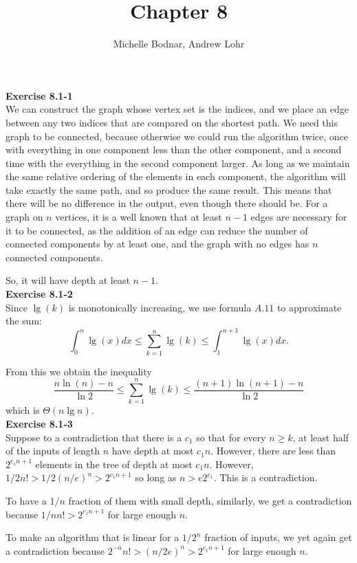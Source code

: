 \documentclass{article}
\title{Chapter 8}
\author{Michelle Bodnar, Andrew Lohr}
\begin{document}
\maketitle

\noindent\textbf{Exercise 8.1-1}\\

We can construct the graph whose vertex set is the indices, and we place an edge between any two indices that are compared on the shortest path. We need this graph to be connected, because otherwise we could run the algorithm twice, once with everything in one component less than the other component, and a second time with the everything in the second component larger. As long as we maintain the same relative ordering of the elements in each component, the algorithm will take exactly the same path, and so produce the same result. This means that there will be no difference in the output, even though there should be. For a graph on $n$ vertices, it is a well known that at least $n-1$ edges are necessary for it to be connected, as the addition of an edge can reduce the number of connected components by at least one, and the graph with no edges has $n$ connected components.

So, it will have depth at least $n-1$.\\

\noindent\textbf{Exercise 8.1-2}\\

Since $\lg(k)$ is monotonically increasing, we use formula $A.11$ to approximate the sum:
\[ \int_0^n \lg(x)dx \leq \sum_{k=1}^n \lg(k) \leq \int_1^{n+1}\lg(x)dx.\]

From this we obtain the inequality 
\[ \frac{n\ln(n)-n}{\ln 2} \leq  \sum_{k=1}^n \lg(k) \leq \frac{(n+1)\ln(n+1) - n}{\ln 2}\]
which is $\Theta(n\lg n)$.\\


\noindent\textbf{Exercise 8.1-3}\\
Suppose to a contradiction that there is a $c_1$ so that for every $n\ge k$, at least half of the inputs of length $n$ have depth at most $c_1 n$. However, there are less than $2^{c_1 n +1}$ elements in the tree of depth at most $c_1 n$. However, $1/2 n! > 1/2(n/e)^n >2^{c_1 n +1}$ so long as $n > e2^{c_1}$. This is a contradiction.

To have a $1/n$ fraction of them with small depth, similarly, we get a contradiction because $1/n n! > 2^{c_1 n+1}$ for large enough $n$.

To make an algorithm that is linear for a $1/2^n$ fraction of inputs, we yet again get a contradiction because $2^{-n} n!  > (n/2e)^n > 2^{c_1 n+1}$ for large enough $n$.
\end{document}
